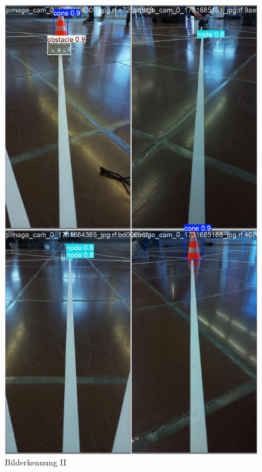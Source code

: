 \begin{figure}[H]
  \hfill
  \begin{minipage}[b]{0.28\textwidth}
    \centering
    \includegraphics[width=\textwidth]{assets/IT/yolo/val_batch1_pred.jpg}
    \caption{Bilderkennung II}
    \label{fig:yolo-ii}
  \end{minipage}
    \hfill
  \begin{minipage}[b]{0.28\textwidth}
    \centering

\end{minipage}
\end{figure}
